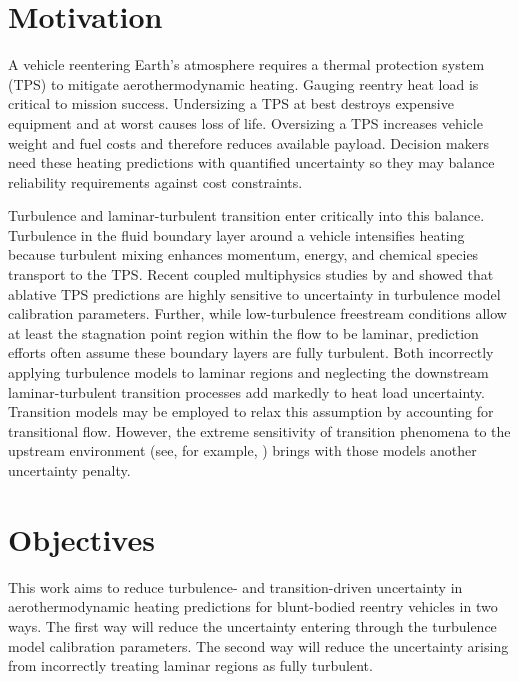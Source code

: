 \section{Motivation}
\label{sec:motivation}

A vehicle reentering Earth's atmosphere requires a thermal protection system
(TPS) to mitigate aerothermodynamic heating.  Gauging reentry heat load is
critical to mission success.  Undersizing a TPS at best destroys expensive
equipment and at worst causes loss of life.  Oversizing a TPS increases vehicle
weight and fuel costs and therefore reduces available payload.  Decision makers
need these heating predictions with quantified uncertainty so they may balance
reliability requirements against cost constraints.

Turbulence and laminar-turbulent transition enter critically into this balance.
Turbulence in the fluid boundary layer around a vehicle intensifies heating
because turbulent mixing enhances momentum, energy, and chemical species
transport to the TPS\@.  Recent coupled multiphysics studies by
\citet{Bauman2011Loose} and \citet{Stogner2011Uncertainty} showed that
ablative TPS predictions are highly sensitive to uncertainty in turbulence model
calibration parameters.  Further, while low-turbulence freestream conditions allow at
least the stagnation point region within the flow to be laminar, prediction
efforts often assume these boundary layers are fully turbulent.  Both
incorrectly applying turbulence models to laminar regions and neglecting the
downstream laminar-turbulent transition processes add markedly to heat load
uncertainty.  Transition models may be employed to relax this assumption by
accounting for transitional flow.  However, the extreme sensitivity of
transition phenomena to the upstream environment (see, for example,
\citet{Federov2011Transition}) brings with those models another uncertainty
penalty.

\section{Objectives}

This work aims to reduce turbulence- and transition-driven uncertainty in
aerothermodynamic heating predictions for blunt-bodied reentry vehicles in two
ways.  The first way will reduce the uncertainty entering through the turbulence
model calibration parameters.  The second way will reduce the uncertainty
arising from incorrectly treating laminar regions as fully turbulent.

